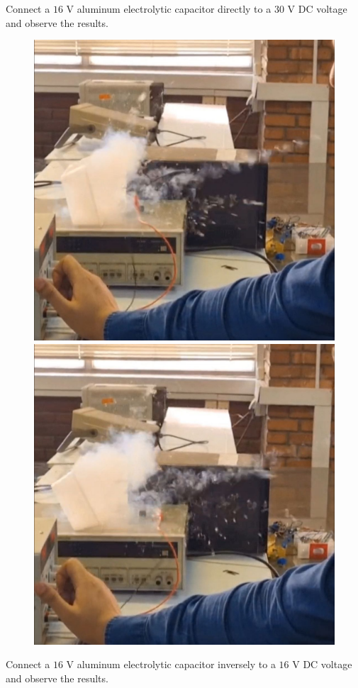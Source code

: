 \documentclass[11pt]{article}
\begin{document}
\begin{question}
\begin{subquestion}{Connect a $16$ V aluminum electrolytic capacitor directly to a $30$ V DC voltage and observe the results.}
{\begin{figure}[H]
                \includegraphics[scale=0.08,angle=0]{Fig/6.jpeg}
                \includegraphics[scale=0.08,angle=0]{Fig/7.jpeg}
            \end{figure}
            
        }
    \end{subquestion}

    \begin{subquestion}{Connect a $16$ V aluminum electrolytic capacitor inversely to a $16$ V DC voltage and observe the results.}
        \answer{}
    \end{subquestion}

\end{question}
\end{document}
